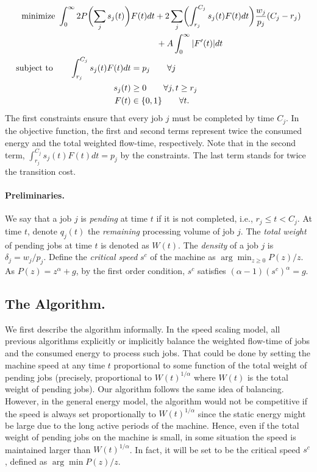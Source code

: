 \documentclass[11pt]{article}
\begin{document}
  \begin{alignat}{3}		\label{relaxation}
    \text{minimize } \int_{0}^{\infty} 2 P\biggl( \sum_{j} s_{j}(t)\biggl) & F(t) dt 
    			+ 2\sum_{j} \biggl(\int_{r_{j}}^{C_{j}} s_{j}(t)F(t)dt\biggl) \frac{w_{j}}{p_{j}}(C_{j} - r_{j}) \notag \\
			&\qquad \quad + A \int_{0}^{\infty} |F'(t)|dt \\
\text{subject to} \qquad    \int_{r_{j}}^{C_{j}} s_{j}(t)F(t)dt &= p_{j}  \qquad \forall j \notag \\
	      s_{j}(t) &\geq 0 \qquad \forall j, t \geq r_{j} \notag \\
		F(t) &\in \{0,1\}  \qquad \forall  t.		\notag
  \end{alignat}
The first constraints ensure that every job $j$ must 
be completed by time $C_{j}$. 
In the objective function, the first and second terms represent
twice the consumed energy and the total weighted flow-time, respectively. 
Note that in the second term, $\int_{r_{j}}^{C_{j}} s_{j}(t)F(t)dt = p_{j}$ by the constraints. 
The last term stands for twice the transition cost. 





\paragraph{Preliminaries.}
We say that a job $j$ is \emph{pending} at time $t$ if it is not completed, i.e., $r_{j} \leq t < C_{j}$. 
At time $t$, denote $q_{j}(t)$ the \emph{remaining} processing volume of job $j$.
The \emph{total weight} of pending jobs at time $t$ 
is denoted as $W(t)$. 
The \emph{density} of a job $j$ is $\delta_{j} = w_{j}/p_{j}$. 
Define the \emph{critical speed} $s^{c}$ of the machine 
as $\arg \min_{z \geq 0} P(z)/z$. As $P(z) = z^{\alpha} + g$, by 
the first order condition, $s^{c}$ satisfies $(\alpha-1)(s^{c})^{\alpha} = g$.


\subsection{The Algorithm.} 

We first describe the algorithm informally. In the speed scaling model, all previous algorithms 
explicitly or implicitly balance the weighted flow-time of jobs and the consumed energy to process such jobs. 
That could be done by setting the machine speed at any time $t$ proportional to 
some function of the total weight of pending jobs (precisely, proportional to 
$W(t)^{1/\alpha}$ where $W(t)$ is the total weight of pending jobs).
Our algorithm follows the same idea of balancing.
However, in the general energy model, the algorithm would not be competitive if 
the speed is always set proportionally to $W(t)^{1/\alpha}$ since the static energy might be large
due to the long active periods of the machine. Hence, even if the total weight of 
pending jobs on the machine is small, in some situation the speed is maintained larger than 
$W(t)^{1/\alpha}$. In fact, it will be set to be the critical 
speed $s^{c}$, defined as $\arg \min P(z)/z$. 
\end{document}
